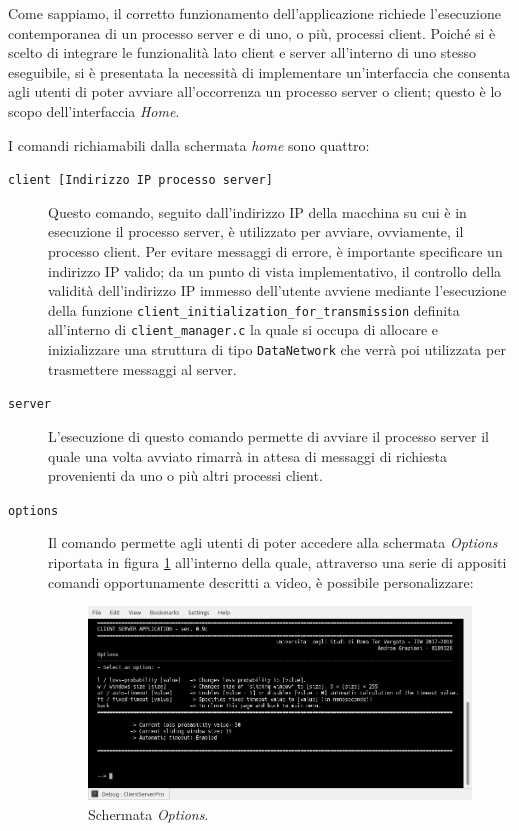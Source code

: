 \documentclass[10pt,a4paper, titlepage]{report}
\begin{document}
Come sappiamo, il corretto funzionamento dell'applicazione richiede l'esecuzione contemporanea di un processo server e di uno, o più, processi client. Poiché si è scelto di integrare le funzionalità lato client e server all'interno di uno stesso eseguibile, si è presentata la necessità di implementare un'interfaccia che consenta agli utenti di poter avviare all'occorrenza un processo server o client; questo è lo scopo dell'interfaccia \textit{Home}.

I comandi richiamabili dalla schermata \textit{home} sono quattro:

\begin{description}
\item[\texttt{client [Indirizzo IP processo server]}] Questo comando, seguito dall'indirizzo IP della macchina su cui è in esecuzione il processo server, è utilizzato per avviare, ovviamente, il processo client. Per evitare messaggi di errore, è importante specificare un indirizzo IP valido; da un punto di vista implementativo, il controllo della validità dell'indirizzo IP immesso dell'utente avviene mediante l'esecuzione della funzione \texttt{client\_initialization\_for\_transmission} definita all'interno di \texttt{client\_manager.c} la quale si occupa di allocare e inizializzare una struttura di tipo \texttt{DataNetwork} che verrà poi utilizzata per trasmettere messaggi al server.

\item[\texttt{server}] L'esecuzione di questo comando permette di avviare il processo server il quale una volta avviato rimarrà in attesa di messaggi di richiesta provenienti da uno o più altri processi client. 

\item[\texttt{options}] Il comando permette agli utenti di poter accedere alla schermata \textit{Options} riportata in figura \ref{fig:options} all'interno della quale, attraverso una serie di appositi comandi opportunamente descritti a video, è possibile personalizzare:  

\begin{figure}
\centering
\includegraphics[width=\textwidth]{Options}
\caption{Schermata \textit{Options}.}
\label{fig:options}
\end{figure}


\end{description}
\end{document}
